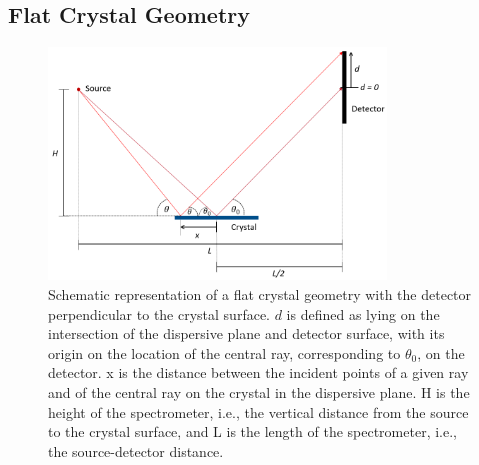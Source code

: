 \subsection{Flat Crystal Geometry}

\begin{figure}[H]
	\centering
	\includegraphics[width=0.8\textwidth]{Diagrams/DUCKDispersionCalc.PNG}
	\caption{Schematic representation of a flat crystal geometry with the 
	detector 
	perpendicular to the crystal surface.  $d$ is 
	defined as lying on the intersection of the dispersive plane and detector 
	surface, with its origin on the location of the central ray, corresponding 
	to $\theta_0$, on the detector. x is the distance between the 
	incident points
	of a given ray and of the central ray on the crystal in the dispersive 
	plane. H is the height of the spectrometer, i.e., the vertical distance 
	from 
	the 
	source to the crystal surface, and L is the length of the 
	spectrometer, i.e., the source-detector distance.}
	\label{DispersionDUCK}
\end{figure}

